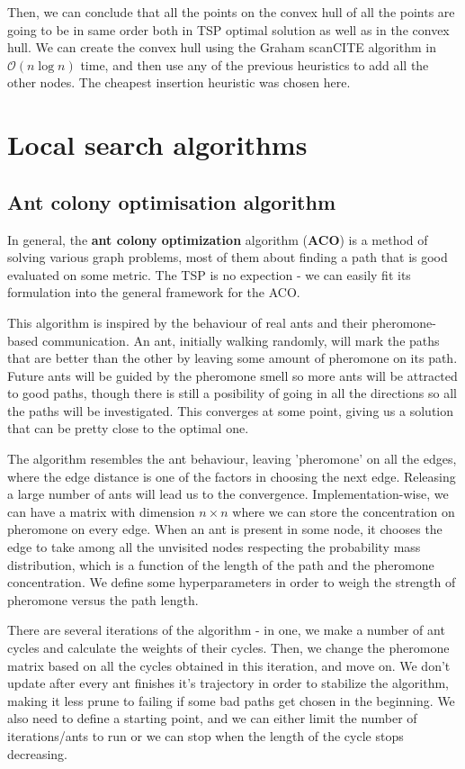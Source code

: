 \documentclass[12pt,twoside,notitlepage]{report}
\begin{document}
Then, we can conclude that all the points on the convex hull of all the points are going to be in same order both in TSP optimal solution as well as in the convex hull. We can create the convex hull using the Graham scanCITE algorithm in $ \mathcal{O}(n \log n) $ time, and then use any of the previous heuristics to add all the other nodes. The cheapest insertion heuristic was chosen here.

\section{Local search algorithms}

\subsection{Ant colony optimisation algorithm}

In general, the {\bf ant colony optimization} algorithm ({\bf ACO}) is a method of solving various graph problems, most of them about finding a path that is good evaluated on some metric. The TSP is no expection - we can easily fit its formulation into the general framework for the ACO.

This algorithm is inspired by the behaviour of real ants and their pheromone-based communication. An ant, initially walking randomly, will mark the paths that are better than the other by leaving some amount of pheromone on its path. Future ants will be guided by the pheromone smell so more ants will be attracted to good paths, though there is still a posibility of going in all the directions so all the paths will be investigated. This converges at some point, giving us a solution that can be pretty close to the optimal one.

The algorithm resembles the ant behaviour, leaving 'pheromone' on all the edges, where the edge distance is one of the factors in choosing the next edge. Releasing a large number of ants will lead us to the convergence. Implementation-wise, we can have a matrix with dimension $n \times n$ where we can store the concentration on pheromone on every edge. When an ant is present in some node, it chooses the edge to take among all the unvisited nodes respecting the probability mass distribution, which is a function of the length of the path and the pheromone concentration. We define some hyperparameters in order to weigh the strength of pheromone versus the path length.

There are several iterations of the algorithm - in one, we make a number of ant cycles and calculate the weights of their cycles. Then, we change the pheromone matrix based on all the cycles obtained in this iteration, and move on. We don't update after every ant finishes it's trajectory in order to stabilize the algorithm, making it less prune to failing if some bad paths get chosen in the beginning. We also need to define a starting point, and we can either limit the number of iterations/ants to run or we can stop when the length of the cycle stops decreasing. 
\end{document}
